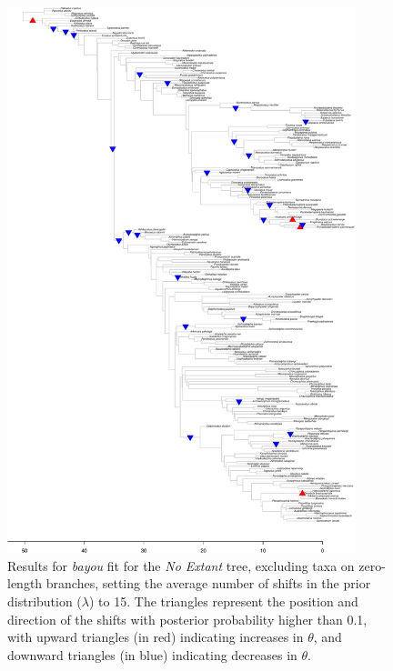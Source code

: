 \begin{figure}[H]
\includegraphics[width=0.9\textwidth]{img/plots-noextant-k15-1.pdf}
\caption{Results for \textit{bayou} fit for the \textit{No Extant} tree, excluding taxa on zero-length branches, setting the average number of shifts in the prior distribution ($\lambda$) to 15. The triangles represent the position and direction of the shifts with posterior probability higher than 0.1, with upward triangles (in red) indicating increases in $\theta$, and downward triangles (in blue) indicating decreases in $\theta$.}
\label{fig:extant-k15-nzlb}
\end{figure}

\newpage

